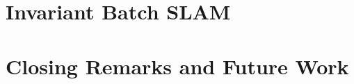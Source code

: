 \documentclass[reqno, 12pt, onesidie]{report}
\begin{document}
\cleardoublepage
    \chapter{Invariant Batch SLAM}
    \label{chap:batch}
    

\cleardoublepage
  \chapter{Closing Remarks and Future Work}
  \label{chap:conc}
  





\cleardoublepage


 \begin{singlespace} %
   \printbibliography
 \end{singlespace}


\end{document}
